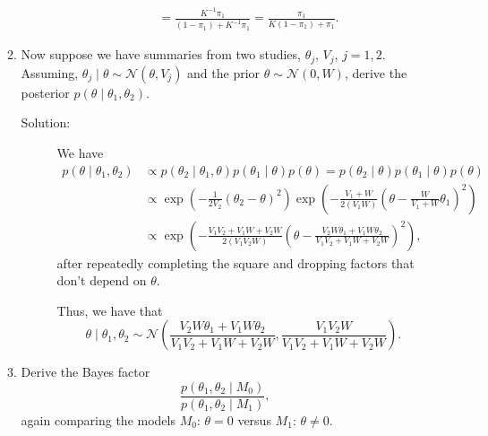 \documentclass[letterpaper,11pt]{article}
\begin{document}
\begin{enumerate}
\begin{enumerate}
\begin{description}
\begin{align*}
        &= \frac
          {K^{-1}\pi_1}
          {\left(1 - \pi_1\right) + K^{-1}\pi_1}
          = \frac
          {\pi_1}{K\left(1 - \pi_1\right) + \pi_1}.
      \end{align*}
    \end{description}
  \item Now suppose we have summaries from two studies, $\theta_j$, $V_j$,
    $j = 1,2$. Assuming,
    $\theta_j \mid \theta \sim \mathcal{N}\left(\theta, V_j\right)$ and the
    prior $\theta \sim \mathcal{N}\left(0,W\right)$, derive the posterior
    $p\left(\theta \mid \theta_1,\theta_2\right)$.
    \begin{description}
    \item[Solution:] We have
      \begin{align*}
        p\left(\theta \mid \theta_1,\theta_2\right)
        &\propto
          p\left(\theta_2 \mid \theta_1, \theta \right)
          p\left(\theta_1 \mid \theta \right)p\left(\theta\right)
          =
          p\left(\theta_2 \mid \theta \right)
          p\left(\theta_1 \mid \theta \right)p\left(\theta\right) \\
        &\propto
          \exp\left(
          -\frac{1}{2V_2}
          \left(\theta_2 - \theta\right)^2
          \right)
          \exp\left(
          -\frac{V_1 + W}{2\left(V_1W\right)}
          \left(\theta - \frac{W}{V_1+W}\theta_1\right)^2
          \right) \\
        &\propto
          \exp\left(
          -\frac{V_1V_2 + V_1W + V_2W}{2\left(V_1V_2W\right)}
          \left(
          \theta - \frac{V_2W\theta_1 + V_1W\theta_2}{V_1V_2 + V_1W + V_2W}
          \right)^2
          \right),
      \end{align*}
      after repeatedly completing the square and dropping factors that don't
      depend on $\theta$.

      Thus, we have that
      \begin{equation}
        \theta \mid \theta_1,\theta_2 \sim \mathcal{N}\left(
          \frac{V_2W\theta_1 + V_1W\theta_2}{V_1V_2 + V_1W + V_2W},
          \frac{V_1V_2W}{V_1V_2 + V_1W + V_2W}
        \right).
        \label{eqn:p2_full_posterior}
      \end{equation}
    \end{description}
  \item \label{part:p2e} Derive the Bayes factor
    \begin{equation}
      \frac{p\left(\theta_1,\theta_2\mid M_0\right)}
      {p\left(\theta_1,\theta_2\mid M_1\right)},
    \end{equation}
    again comparing the models $M_0$: $\theta = 0$ versus $M_1$:
    $\theta \neq 0$.


\end{enumerate}
\end{enumerate}
\end{document}
